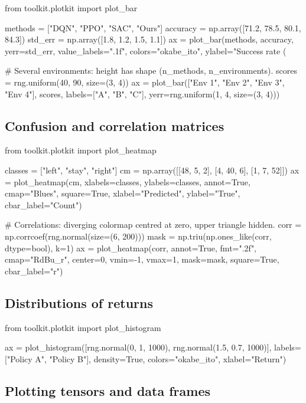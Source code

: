 \begin{pycode}
from toolkit.plotkit import plot_bar

methods = ["DQN", "PPO", "SAC", "Ours"]
accuracy = np.array([71.2, 78.5, 80.1, 84.3])
std_err = np.array([1.8, 1.2, 1.5, 1.1])
ax = plot_bar(methods, accuracy, yerr=std_err, value_labels=".1f",
              colors="okabe_ito", ylabel="Success rate (%

# Several environments: height has shape (n_methods, n_environments).
scores = rng.uniform(40, 90, size=(3, 4))
ax = plot_bar(["Env 1", "Env 2", "Env 3", "Env 4"], scores,
              labels=["A", "B", "C"], yerr=rng.uniform(1, 4, size=(3, 4)))
\end{pycode}

\subsection{Confusion and correlation matrices}

\begin{pycode}
from toolkit.plotkit import plot_heatmap

classes = ["left", "stay", "right"]
cm = np.array([[48, 5, 2], [4, 40, 6], [1, 7, 52]])
ax = plot_heatmap(cm, xlabels=classes, ylabels=classes, annot=True,
                  cmap="Blues", square=True, xlabel="Predicted",
                  ylabel="True", cbar_label="Count")

# Correlations: diverging colormap centred at zero, upper triangle hidden.
corr = np.corrcoef(rng.normal(size=(6, 200)))
mask = np.triu(np.ones_like(corr, dtype=bool), k=1)
ax = plot_heatmap(corr, annot=True, fmt=".2f", cmap="RdBu_r", center=0,
                  vmin=-1, vmax=1, mask=mask, square=True, cbar_label="r")
\end{pycode}

\subsection{Distributions of returns}

\begin{pycode}
from toolkit.plotkit import plot_histogram

ax = plot_histogram([rng.normal(0, 1, 1000), rng.normal(1.5, 0.7, 1000)],
                    labels=["Policy A", "Policy B"], density=True,
                    colors="okabe_ito", xlabel="Return")
\end{pycode}

\subsection{Plotting tensors and data frames}

